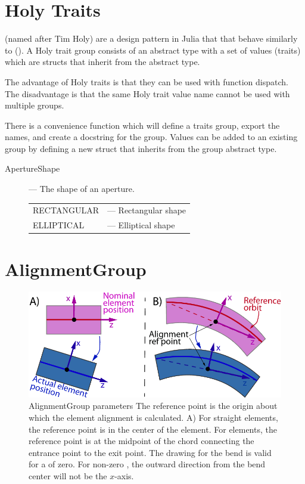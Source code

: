 \section{Holy Traits}
\label{s:holy.traits}

 (named after Tim Holy) are a design pattern in Julia that that behave similarly
to  (). A Holy trait group consists of an abstract type with a set of values
(traits) which are structs that inherit from the abstract type.

The advantage of Holy traits is that they can be used with function dispatch. The disadvantage is
that the same Holy trait value name cannot be used with multiple groups.

There is a convenience function  which will define a traits group, export the names,
and create a docstring for the group. Values can be added to an existing group by defining a 
new struct that inherits from the group abstract type.

\begin{description}
%
\item[ApertureShape] --- The shape of an aperture.\Newline 
\hspace*{-20pt}
\begin{tabular}{ll}
  RECTANGULAR & --- Rectangular shape \\
  ELLIPTICAL  & --- Elliptical shape \\
\end{tabular}
%
\end{description}


\section{AlignmentGroup}
\label{s:align.g}

\begin{figure}
\centering \includegraphics{alignment-ref.pdf} 
\caption[Element alignment.]  
{AlignmentGroup parameters The reference point is the origin
about which the element alignment is calculated. 
A) For straight elements, the reference point is in the center of the element. 
For  elements, the reference point is at the midpoint of the chord connecting
the entrance point to the exit point. The drawing for the bend is valid for a 
of zero. For non-zero , the outward direction from the bend center will not be
the $x$-axis. 
}  \label{f:alignment}
\end{figure}

